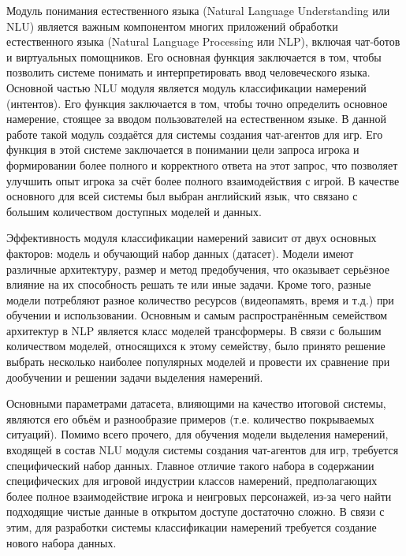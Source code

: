 Модуль понимания естественного языка (Natural Language Understanding или NLU) является важным компонентом многих приложений обработки 
естественного языка (Natural Language Processing или NLP), включая чат-ботов и виртуальных помощников. Его основная функция заключается в том, чтобы  позволить системе понимать и интерпретировать ввод человеческого языка. Основной частью NLU модуля является модуль классификации намерений (интентов). Его функция заключается в том, чтобы точно определить основное намерение, стоящее за вводом пользователей на естественном языке. В данной работе такой модуль создаётся для системы создания чат-агентов для игр. Его функция в этой системе заключается в понимании цели запроса игрока и формировании более полного и корректного ответа на этот запрос, что позволяет улучшить опыт игрока за счёт более полного взаимодействия с игрой. В качестве основного для всей системы был выбран английский язык, что связано с большим количеством доступных моделей и данных. 

Эффективность модуля классификации намерений зависит от двух основных факторов: модель и обучающий набор данных (датасет). Модели имеют различные архитектуру, размер и метод предобучения, что оказывает серьёзное влияние на их способность решать те или иные задачи. Кроме того, разные модели потребляют разное количество ресурсов (видеопамять, время и т.д.) при обучении и использовании. Основным и самым распространённым семейством архитектур в NLP является класс моделей трансформеры. В связи с большим количеством моделей, относящихся к этому семейству, было принято решение выбрать несколько наиболее популярных моделей и провести их сравнение при дообучении и решении задачи выделения намерений.

Основными параметрами датасета, влияющими на качество итоговой системы, являются его объём и разнообразие примеров (т.е. количество покрываемых ситуаций). Помимо всего прочего, для обучения модели выделения намерений, входящей в состав NLU модуля системы создания чат-агентов для игр, 
требуется специфический набор данных. Главное отличие такого набора в содержании специфических для игровой индустрии классов намерений, 
предполагающих более полное взаимодействие игрока и неигровых персонажей, из-за чего найти подходящие чистые данные 
в открытом доступе достаточно сложно. В связи с этим, для разработки системы классификации намерений требуется создание 
нового набора данных.